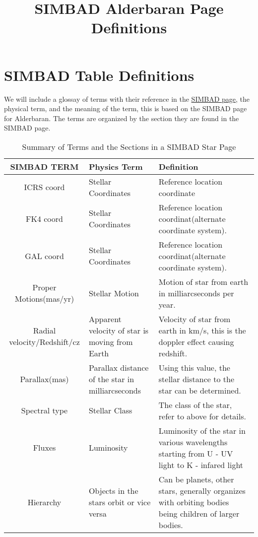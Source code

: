 \documentclass[12pt,oneside,a4paper,english]{article}
\begin{document}
\title{SIMBAD Alderbaran Page Definitions}
\maketitle

\section{SIMBAD Table Definitions}
We will include a glossay of terms with their reference in the \href{URL}{SIMBAD page}, the physical term, and the meaning of the term, this is based on the SIMBAD page for Alderbaran. The terms are organized by the section they are found in the SIMBAD page.
\begin{table}[H]
    \centering
    \caption{Summary of Terms and the Sections in a SIMBAD Star Page}
    \begin{tabular}{|c|p{3cm}|p{9cm}|}
    \centering
    \textbf{SIMBAD TERM} & \textbf{Physics Term} & \textbf{Definition} \\ \hline \hline
            ICRS coord  & Stellar Coordinates    & Reference location coordinate     \\ \hline   
            FK4 coord   & Stellar Coordinates    & Reference location coordinat(alternate coordinate system).  \\ \hline
            GAL coord   & Stellar Coordinates    & Reference location coordinat(alternate coordinate system).   \\ \hline
            Proper Motions(mas/yr) & Stellar Motion & Motion of star from earth in milliarcseconds per year.  \\ \hline 
            Radial velocity/Redshift/cz & Apparent velocity of star is moving from Earth & Velocity of star from earth in km/s, this is the doppler effect causing redshift.  \\ \hline
            Parallax(mas) & Parallax distance of the star in milliarcseconds & Using this value, the stellar distance to the star can be determined.  \\ \hline
            Spectral type & Stellar Class & The class of the star, refer to above for details. \\ \hline
            Fluxes & Luminosity & Luminosity of the star in various wavelengths starting from U - UV light to K - infared light \\ \hline
            Hierarchy & Objects in the stars orbit or vice versa & Can be planets, other stars, generally organizes with orbiting bodies being children of larger bodies. \\ \hline

\end{tabular}
\end{table}
\end{document}
